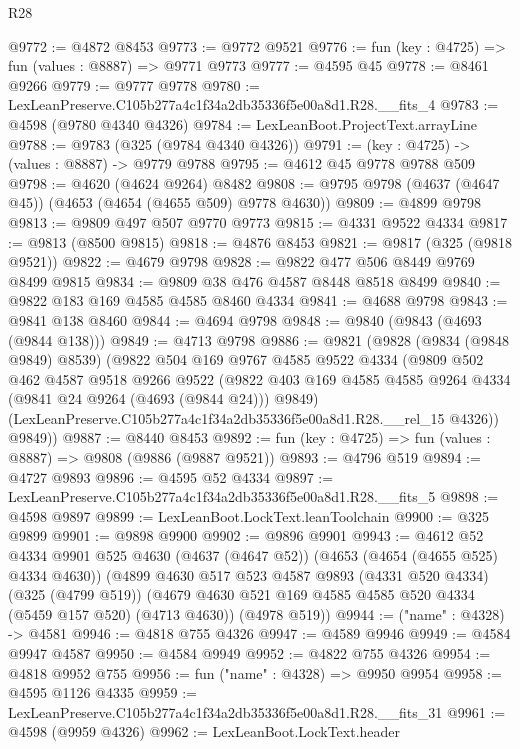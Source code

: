 \begin{lexlean}{R28}
\begin{coremodule}
@9772 := @4872 @8453
@9773 := @9772 @9521
@9776 := fun (key : @4725) => fun (values : @8887) => @9771 @9773
@9777 := @4595 @45
@9778 := @8461 @9266
@9779 := @9777 @9778
@9780 := LexLeanPreserve.C105b277a4c1f34a2db35336f5e00a8d1.R28.__fits_4
@9783 := @4598 (@9780 @4340 @4326)
@9784 := LexLeanBoot.ProjectText.arrayLine
@9788 := @9783 (@325 (@9784 @4340 @4326))
@9791 := (key : @4725) -> (values : @8887) -> @9779 @9788
@9795 := @4612 @45 @9778 @9788 @509
@9798 := @4620 (@4624 @9264) @8482
@9808 := @9795 @9798 (@4637 (@4647 @45)) (@4653 (@4654 (@4655 @509) @9778 @4630))
@9809 := @4899 @9798
@9813 := @9809 @497 @507 @9770 @9773
@9815 := @4331 @9522 @4334
@9817 := @9813 (@8500 @9815)
@9818 := @4876 @8453
@9821 := @9817 (@325 (@9818 @9521))
@9822 := @4679 @9798
@9828 := @9822 @477 @506 @8449 @9769 @8499 @9815
@9834 := @9809 @38 @476 @4587 @8448 @8518 @8499
@9840 := @9822 @183 @169 @4585 @4585 @8460 @4334
@9841 := @4688 @9798
@9843 := @9841 @138 @8460
@9844 := @4694 @9798
@9848 := @9840 (@9843 (@4693 (@9844 @138)))
@9849 := @4713 @9798
@9886 := @9821
    (@9828
      (@9834 (@9848 @9849) @8539)
      (@9822
        @504
        @169
        @9767
        @4585
        @9522
        @4334
        (@9809
          @502
          @462
          @4587
          @9518
          @9266
          @9522
          (@9822 @403 @169 @4585 @4585 @9264 @4334 (@9841 @24 @9264 (@4693 (@9844 @24))) @9849)
          (LexLeanPreserve.C105b277a4c1f34a2db35336f5e00a8d1.R28.__rel_15 @4326))
        @9849))
@9887 := @8440 @8453
@9892 := fun (key : @4725) => fun (values : @8887) => @9808 (@9886 (@9887 @9521))
@9893 := @4796 @519
@9894 := @4727 @9893
@9896 := @4595 @52 @4334
@9897 := LexLeanPreserve.C105b277a4c1f34a2db35336f5e00a8d1.R28.__fits_5
@9898 := @4598 @9897
@9899 := LexLeanBoot.LockText.leanToolchain
@9900 := @325 @9899
@9901 := @9898 @9900
@9902 := @9896 @9901
@9943 := @4612
    @52
    @4334
    @9901
    @525
    @4630
    (@4637 (@4647 @52))
    (@4653 (@4654 (@4655 @525) @4334 @4630))
    (@4899
      @4630
      @517
      @523
      @4587
      @9893
      (@4331 @520 @4334)
      (@325 (@4799 @519))
      (@4679 @4630 @521 @169 @4585 @4585 @520 @4334 (@5459 @157 @520) (@4713 @4630))
      (@4978 @519))
@9944 := ("name" : @4328) -> @4581
@9946 := @4818 @755 @4326
@9947 := @4589 @9946
@9949 := @4584 @9947 @4587
@9950 := @4584 @9949
@9952 := @4822 @755 @4326
@9954 := @4818 @9952 @755
@9956 := fun ("name" : @4328) => @9950 @9954
@9958 := @4595 @1126 @4335
@9959 := LexLeanPreserve.C105b277a4c1f34a2db35336f5e00a8d1.R28.__fits_31
@9961 := @4598 (@9959 @4326)
@9962 := LexLeanBoot.LockText.header

\end{coremodule}
\end{lexlean}
